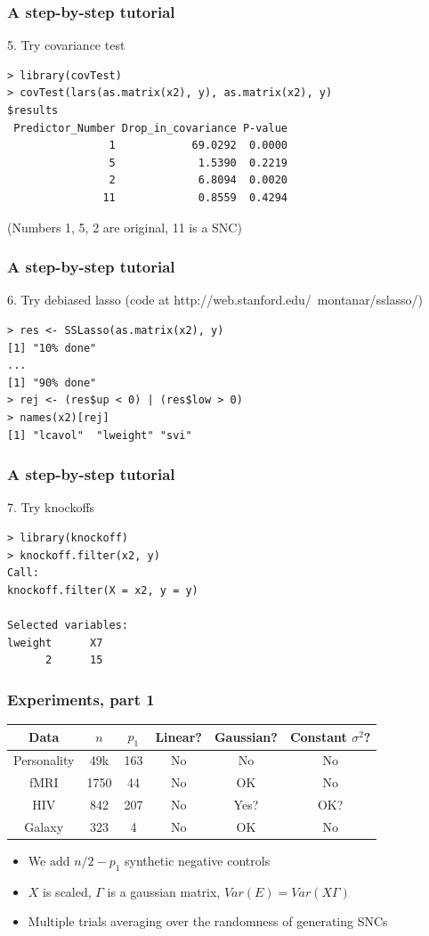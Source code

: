 \documentclass{beamer}
\begin{document}
\begin{frame}[fragile]
\frametitle{A step-by-step tutorial}
5. Try covariance test
\begin{verbatim}
> library(covTest)
> covTest(lars(as.matrix(x2), y), as.matrix(x2), y)
$results
 Predictor_Number Drop_in_covariance P-value
                1            69.0292  0.0000
                5             1.5390  0.2219
                2             6.8094  0.0020
               11             0.8559  0.4294
\end{verbatim}
(Numbers 1, 5, 2 are original, 11 is a SNC)
\end{frame}

\begin{frame}[fragile]
\frametitle{A step-by-step tutorial}
6. Try debiased lasso (code at http://web.stanford.edu/~montanar/sslasso/)
\begin{verbatim}
> res <- SSLasso(as.matrix(x2), y)
[1] "10% done"
...
[1] "90% done"
> rej <- (res$up < 0) | (res$low > 0)
> names(x2)[rej]
[1] "lcavol"  "lweight" "svi"    
\end{verbatim}
\end{frame}

\begin{frame}[fragile]
\frametitle{A step-by-step tutorial}
7. Try knockoffs
\begin{verbatim}
> library(knockoff)
> knockoff.filter(x2, y)
Call:
knockoff.filter(X = x2, y = y)

Selected variables:
lweight      X7 
      2      15 
\end{verbatim}
\end{frame}

\begin{frame}
\frametitle{Experiments, part 1}
\begin{center}
\begin{tabular}{|c|c|c|c|c|c|}
\hline
Data & $n$ & $p_1$ & Linear? & Gaussian? & Constant $\sigma^2$?\\ \hline
Personality & 49k & 163 & No & No & No\\ \hline
fMRI & 1750 & 44 & No & OK & No \\ \hline
HIV & 842 & 207 & No & Yes? & OK? \\ \hline
Galaxy & 323 & 4 & No & OK & No \\ \hline
\end{tabular}
\end{center}
\begin{itemize}
\item We add $n/2 - p_1$ synthetic negative controls
\item $X$ is scaled, $\Gamma$ is a gaussian matrix, $Var(E) = Var(X\Gamma)$
\item Multiple trials averaging over the randomness of generating SNCs
\end{itemize}
\end{frame}
\end{document}
